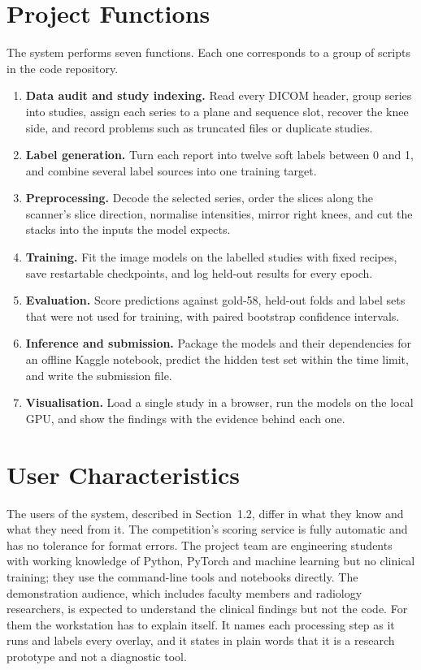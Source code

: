 \section{Project Functions}

The system performs seven functions. Each one corresponds to a group of scripts in the code repository.

\begin{enumerate}[label=\arabic*., leftmargin=1.6em]
\item \textbf{Data audit and study indexing.} Read every DICOM header, group series into studies, assign each series to a plane and sequence slot, recover the knee side, and record problems such as truncated files or duplicate studies.
\item \textbf{Label generation.} Turn each report into twelve soft labels between 0 and 1, and combine several label sources into one training target.
\item \textbf{Preprocessing.} Decode the selected series, order the slices along the scanner's slice direction, normalise intensities, mirror right knees, and cut the stacks into the inputs the model expects.
\item \textbf{Training.} Fit the image models on the labelled studies with fixed recipes, save restartable checkpoints, and log held-out results for every epoch.
\item \textbf{Evaluation.} Score predictions against gold-58, held-out folds and label sets that were not used for training, with paired bootstrap confidence intervals.
\item \textbf{Inference and submission.} Package the models and their dependencies for an offline Kaggle notebook, predict the hidden test set within the time limit, and write the submission file.
\item \textbf{Visualisation.} Load a single study in a browser, run the models on the local GPU, and show the findings with the evidence behind each one.
\end{enumerate}

\section{User Characteristics}

The users of the system, described in Section~1.2, differ in what they know and what they need from it. The competition's scoring service is fully automatic and has no tolerance for format errors. The project team are engineering students with working knowledge of Python, PyTorch and machine learning but no clinical training; they use the command-line tools and notebooks directly. The demonstration audience, which includes faculty members and radiology researchers, is expected to understand the clinical findings but not the code. For them the workstation has to explain itself. It names each processing step as it runs and labels every overlay, and it states in plain words that it is a research prototype and not a diagnostic tool.

